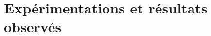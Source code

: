 \chapter{Expérimentations et résultats observés}
    \section{}
        \subsection{}
            \subsubsection{}